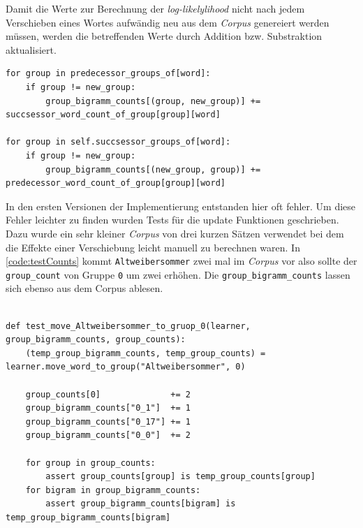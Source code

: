 		Damit die Werte zur Berechnung der \emph{log-likelylihood} nicht nach jedem Verschieben eines Wortes aufwändig neu aus dem \emph{Corpus} genereiert werden müssen, werden die betreffenden Werte durch Addition bzw. Substraktion aktualisiert. \parencite[S. 26 f. Abschnitt 3.1.2]{speechcommunication:exchange}
            
        \newpage
        \begin{lstlisting}[caption=Beispiel für das Aktualisieren von \emph{counts} nachdem ein Wort zu einer Klasse hinzugefügt wurde.,label=code:countUpdate, captionpos=b]
for group in predecessor_groups_of[word]:
	if group != new_group:
        group_bigramm_counts[(group, new_group)] += succsessor_word_count_of_group[group][word]
 
for group in self.succsessor_groups_of[word]:
	if group != new_group:
        group_bigramm_counts[(new_group, group)] += predecessor_word_count_of_group[group][word]
        \end{lstlisting}
  
		In den ersten Versionen der Implementierung entstanden hier oft fehler. Um diese Fehler leichter zu finden wurden Tests für die update Funktionen geschrieben. Dazu wurde ein sehr kleiner \emph{Corpus} von drei kurzen Sätzen verwendet bei dem die Effekte einer Verschiebung leicht manuell zu berechnen waren. In \autoref{code:testCounts} kommt \texttt{Altweibersommer} zwei mal im \emph{Corpus} vor also sollte der \texttt{group\_count} von Gruppe \texttt{0} um zwei erhöhen. Die \texttt{group\_bigramm\_counts} lassen sich ebenso aus dem Corpus ablesen.

		\begin{lstlisting}[caption=Beispiel eines Tests zum Aktualisieren von \emph{counts} nachdem ein Wort einer Klasse hinzugefügt wurde., captionpos=b, label=code:testCounts]
                
def test_move_Altweibersommer_to_gruop_0(learner, group_bigramm_counts, group_counts):
    (temp_group_bigramm_counts, temp_group_counts) = learner.move_word_to_group("Altweibersommer", 0)

    group_counts[0]              += 2
    group_bigramm_counts["0_1"]  += 1
    group_bigramm_counts["0_17"] += 1
    group_bigramm_counts["0_0"]  += 2

    for group in group_counts:
        assert group_counts[group] is temp_group_counts[group]
    for bigram in group_bigramm_counts:
        assert group_bigramm_counts[bigram] is temp_group_bigramm_counts[bigram]
		\end{lstlisting}
                
